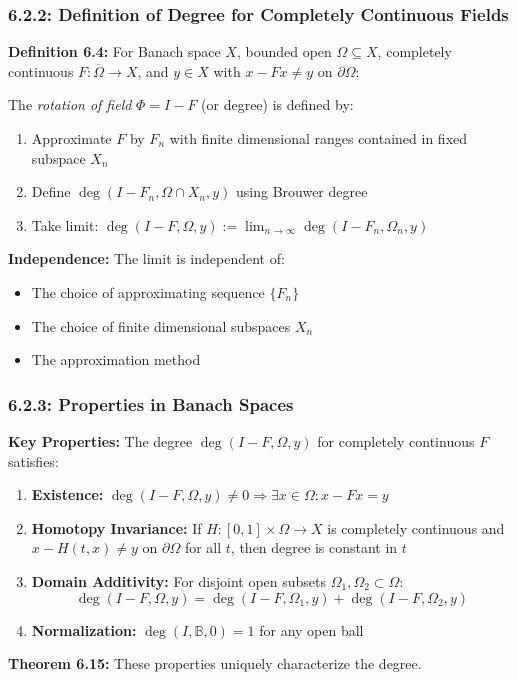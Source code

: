 \documentclass[aspectratio=169,10pt]{beamer}
\begin{document}
\begin{frame}
\frametitle{6.2.2: Definition of Degree for Completely Continuous Fields}

\textbf{Definition 6.4:} For Banach space $X$, bounded open $\Omega \subseteq X$, completely continuous $F: \overline{\Omega} \to X$, and $y \in X$ with $x - Fx \neq y$ on $\partial\Omega$:

\vspace{0.2cm}
The \emph{rotation of field} $\Phi = I - F$ (or degree) is defined by:
\begin{enumerate}
    \item Approximate $F$ by $F_n$ with finite dimensional ranges contained in fixed subspace $X_n$
    \item Define $\deg(I - F_n, \Omega \cap X_n, y)$ using Brouwer degree
    \item Take limit: $\deg(I - F, \Omega, y) := \lim_{n \to \infty} \deg(I - F_n, \Omega_n, y)$
\end{enumerate}

\vspace{0.3cm}
\textbf{Independence:} The limit is independent of:
\begin{itemize}
    \item The choice of approximating sequence $\{F_n\}$
    \item The choice of finite dimensional subspaces $X_n$
    \item The approximation method
\end{itemize}
\end{frame}

\begin{frame}
\frametitle{6.2.3: Properties in Banach Spaces}

\textbf{Key Properties:} The degree $\deg(I - F, \Omega, y)$ for completely continuous $F$ satisfies:

\vspace{0.2cm}
\begin{enumerate}
    \item \textbf{Existence:} $\deg(I - F, \Omega, y) \neq 0 \Rightarrow \exists x \in \Omega: x - Fx = y$
    \vspace{0.2cm}
    \item \textbf{Homotopy Invariance:} If $H: [0,1] \times \Omega \to X$ is completely continuous and $x - H(t,x) \neq y$ on $\partial\Omega$ for all $t$, then degree is constant in $t$
    \vspace{0.2cm}
    \item \textbf{Domain Additivity:} For disjoint open subsets $\Omega_1, \Omega_2 \subset \Omega$:
    $$\deg(I - F, \Omega, y) = \deg(I - F, \Omega_1, y) + \deg(I - F, \Omega_2, y)$$
    \vspace{0.2cm}
    \item \textbf{Normalization:} $\deg(I, \mathbb{B}, 0) = 1$ for any open ball
\end{enumerate}

\vspace{0.2cm}
\textbf{Theorem 6.15:} These properties uniquely characterize the degree.
\end{frame}
\end{document}
